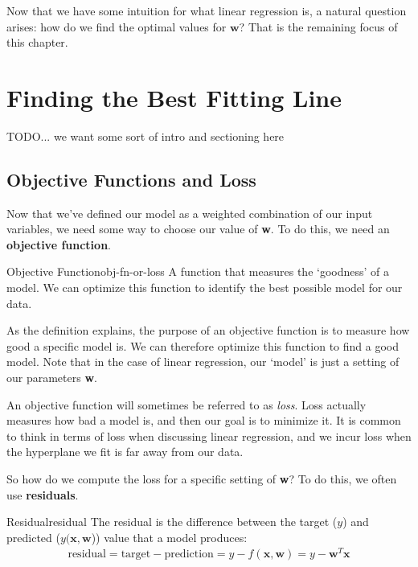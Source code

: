 
Now that we have some intuition for what linear regression is, a natural question arises: how do we find the optimal values for $\textbf{w}$? That is the remaining focus of this chapter.

\section{Finding the Best Fitting Line}
TODO... we want some sort of intro and sectioning here

\subsection{Objective Functions and Loss}
Now that we've defined our model as a weighted combination of our input variables, we need some way to choose our value of \textbf{w}. To do this, we need an \textbf{objective function}.

\begin{definition}{Objective Function}{obj-fn-or-loss}
A function that measures the `goodness' of a model. We can optimize this function to identify the best possible model for our data.
\end{definition}

As the definition explains, the purpose of an objective function is to measure how good a specific model is. We can therefore optimize this function to find a good model. Note that in the case of linear regression, our `model' is just a setting of our parameters \textbf{w}.

An objective function will sometimes be referred to as \textit{loss}. Loss actually measures how bad a model is, and then our goal is to minimize it. It is common to think in terms of loss when discussing linear regression, and we incur loss when the hyperplane we fit is far away from our data.

So how do we compute the loss for a specific setting of \textbf{w}? To do this, we often use \textbf{residuals}.

\begin{definition}{Residual}{residual}
The residual is the difference between the target ($y$) and predicted ($y(\textbf{x}, \textbf{w}$)) value that a model produces:
\begin{align*}
    \text{residual} = \text{target} - \text{prediction} = y - f(\textbf{x}, \textbf{w}) = \boxed{y - \textbf{w}^{T}\textbf{x}}
\end{align*}
\end{definition}

